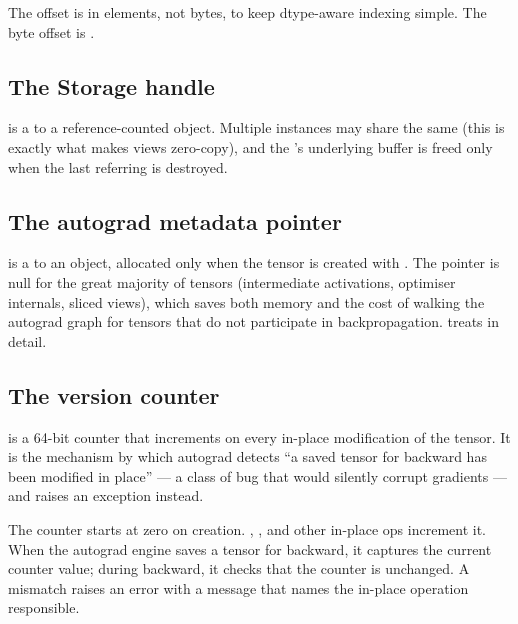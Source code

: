 The offset is in elements, not bytes, to keep dtype-aware indexing
simple. The byte offset is .

\subsection{The Storage handle}
\label{ssec:tensor_model:storage_handle}

 is a  to a reference-counted
 object. Multiple  instances may
share the same  (this is exactly what makes views
zero-copy), and the 's underlying buffer is freed
only when the last referring  is destroyed.

\subsection{The autograd metadata pointer}
\label{ssec:tensor_model:autograd_ptr}

 is a  to an
 object, allocated only when the tensor is
created with . The pointer is null for
the great majority of tensors (intermediate activations, optimiser
internals, sliced views), which saves both memory and the cost of
walking the autograd graph for tensors that do not participate in
backpropagation.  treats
 in detail.

\subsection{The version counter}
\label{ssec:tensor_model:version_counter}

 is a 64-bit counter that increments on
every in-place modification of the tensor. It is the mechanism by
which autograd detects ``a saved tensor for backward has been
modified in place'' --- a class of bug that would silently corrupt
gradients --- and raises an exception instead.

The counter starts at zero on creation. , ,
and other in-place ops increment it. When the autograd engine saves
a tensor for backward, it captures the current counter value;
during backward, it checks that the counter is unchanged. A mismatch
raises an error with a message that names the in-place operation
responsible.

